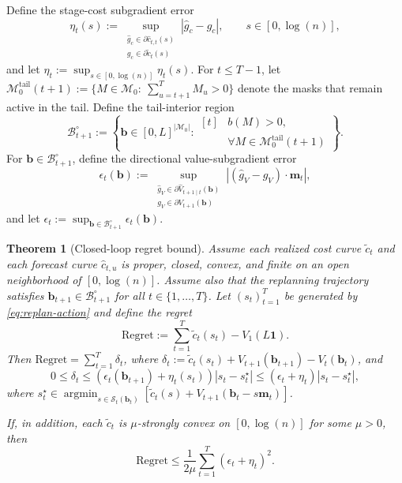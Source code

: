 \documentclass{uai2026} %
\newtheorem{theorem}{Theorem}[section]
\newcommand{\1}{\mathbf{1}}
\newcommand{\scalt}{\mathcal{S}_{t}}
\newcommand{\mcal}{\mathcal{M}}
\begin{document}
Define the stage-cost subgradient error
\begin{equation}
  \label{eq:eta-def}
  \eta_t(s)
  := \sup_{\substack{\hat{g}_c \in \partial \hat{c}_{t,t}(s)\\ g_c \in \partial \tilde{c}_t(s)}} |\hat{g}_c-g_c|,
  \qquad s\in[0,\log(n)],
\end{equation}
and let $\eta_t:=\sup_{s\in[0,\log(n)]}\eta_t(s)$.
For $t\le T-1$, let
$\mcal_{0}^{\mathrm{tail}}(t+1):=\{M\in\mcal_{0}:\ \sum_{u=t+1}^{T} M_u>0\}$
denote the masks that remain active in the tail.
Define the tail-interior region
\begin{equation*}
  \mathcal{B}_{t+1}^\circ
  :=
  \left\{\mathbf{b}\in[0,L]^{|\mcal_{0}|}:
    \begin{aligned}[t]
      & b(M)>0,\\
      & \forall M\in\mcal_{0}^{\mathrm{tail}}(t+1)
    \end{aligned}
  \right\}.
\end{equation*}
For $\mathbf{b}\in\mathcal{B}_{t+1}^\circ$, define the directional value-subgradient error
\begin{equation}
  \label{eq:epsilon-def}
  \epsilon_t(\mathbf{b})
  := \sup_{\substack{\hat{g}_V\in \partial \hat{V}_{t+1\mid t}(\mathbf{b})\\ g_V\in \partial V_{t+1}(\mathbf{b})}}
  \left|(\hat{g}_V-g_V)\cdot \mathbf{m}_t\right|,
\end{equation}
and let $\epsilon_t:=\sup_{\mathbf{b}\in\mathcal{B}_{t+1}^\circ}\epsilon_t(\mathbf{b})$.

\begin{theorem}[Closed-loop regret bound]
  \label{thm:replan-regret}
  Assume each realized cost curve $\tilde{c}_t$ and each forecast curve $\hat{c}_{t,u}$ is proper, closed, convex, and finite on an open neighborhood of $[0,\log(n)]$.
  Assume also that the replanning trajectory satisfies $\mathbf{b}_{t+1}\in\mathcal{B}_{t+1}^\circ$ for all $t\in\{1,\dots,T\}$.
  Let $(s_t)_{t=1}^{T}$ be generated by \eqref{eq:replan-action} and define the regret
  \begin{equation*}
    \mathrm{Regret} := \sum_{t=1}^{T} \tilde{c}_t(s_t) - V_1(L\1).
  \end{equation*}
  Then $\mathrm{Regret}=\sum_{t=1}^{T} \delta_t$, where $\delta_t:=\tilde{c}_t(s_t)+V_{t+1}(\mathbf{b}_{t+1})-V_t(\mathbf{b}_t)$, and
  \begin{equation*}
    0 \le \delta_t \le \left(\epsilon_t(\mathbf{b}_{t+1})+\eta_t(s_t)\right)|s_t-s_t^{\star}|
    \le (\epsilon_t+\eta_t)|s_t-s_t^{\star}|,
  \end{equation*}
  where $s_t^{\star}\in\operatorname*{argmin}_{s\in\scalt(\mathbf{b}_t)}[\tilde{c}_t(s)+V_{t+1}(\mathbf{b}_t-s\mathbf{m}_t)]$.

  If, in addition, each $\tilde{c}_t$ is $\mu$-strongly convex on $[0,\log(n)]$ for some $\mu>0$, then
  \begin{equation*}
    \mathrm{Regret} \le \frac{1}{2\mu}\sum_{t=1}^{T} (\epsilon_t+\eta_t)^2.
  \end{equation*}
\end{theorem}
\end{document}
